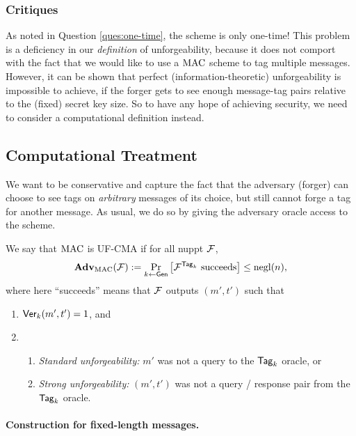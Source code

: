\documentclass[11pt]{article}
\begin{document}
\subsubsection{Critiques}
\label{sec:critiques-info-mac}

As noted in Question \ref{ques:one-time}, the scheme is only one-time!
This problem is a deficiency in our \emph{definition} of
unforgeability, because it does not comport with the fact that we
would like to use a $\text{MAC}$ scheme to tag multiple messages.  However,
it can be shown that perfect (information-theoretic) unforgeability is
impossible to achieve, if the forger gets to see enough message-tag
pairs relative to the (fixed) secret key size.  So to have any hope of
achieving security, we need to consider a computational definition
instead.

\subsection{Computational Treatment}
\label{sec:comp-mac}

We want to be conservative and capture the fact that the adversary
(forger) can choose to see tags on \emph{arbitrary} messages of its
choice, but still cannot forge a tag for another message.  As usual,
we do so by giving the adversary oracle access to the scheme.

\begin{definition}
  \label{def:uf-mca}
  We say that $\text{MAC}$ is UF-CMA if for all nuppt $\mathcal{F}$,
  \[
  \mathbf{Adv}_{\text{MAC}}(\mathcal{F}) := \Pr_{k \gets \mathsf{Gen}}\left[\mathcal{F}^{\mathsf{Tag}_k}
  \text{ succeeds} \right] \leq \operatorname{negl}(n),
  \]
  where here ``succeeds'' means that $\mathcal{F}$ outputs $(m',t')$ such that
  \begin{enumerate}
  \item $\mathsf{Ver}_k(m',t') = 1$, and
  \item 
    \begin{enumerate}
    \item \emph{Standard unforgeability:} $m'$ was not a query to the
      $\mathsf{Tag}_{k}$ oracle, or
    \item \emph{Strong unforgeability:} $(m',t')$ was not a query /
      response pair from the $\mathsf{Tag}_{k}$ oracle.
    \end{enumerate}
  \end{enumerate}
\end{definition}

\paragraph{Construction for fixed-length messages.}
\end{document}
